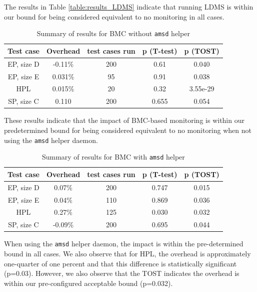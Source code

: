 \documentclass[conference]{IEEEtran}
\begin{document}
The results in Table \ref{table:results_LDMS} indicate that running LDMS is within our bound for being 
considered equivalent to no monitoring in all cases.

\begin{table}[h!]
\centering
\begin{tabular}{| c | c | c | c | c |} 
    \hline
    Test case & Overhead & test cases run & p (T-test) & p (TOST) \\ 
    \hline
    EP, size D & -0.11\% & 200 & 0.61 & 0.040 \\ 
    \hline
    EP, size E & 0.031\% & 95 & 0.91 & 0.038 \\ 
    \hline
    HPL & 0.015\% & 20 & 0.32 & 3.55e-29 \\
    \hline
    SP, size C & 0.110 & 200 & 0.655 & 0.054 \\
    \hline
\end{tabular}
\caption{Summary of results for BMC without \texttt{amsd} helper}
\end{table}

These results indicate that the impact of BMC-based monitoring is within our 
predetermined bound for being considered equivalent to no monitoring when not 
using the \texttt{amsd} helper daemon.

\begin{table}[h!]
\centering
\begin{tabular}{| c | c | c | c | c |} 
    \hline
    Test case & Overhead & test cases run & p (T-test) & p (TOST) \\ 
    \hline
    EP, size D & 0.07\% & 200 & 0.747 & 0.015 \\ 
    \hline
    EP, size E & 0.04\% & 110 & 0.869 & 0.036 \\ 
    \hline
    HPL & 0.27\% & 125 & 0.030 & 0.032 \\
    \hline
    SP, size C & -0.09\% & 200 & 0.695 & 0.044 \\
    \hline
\end{tabular}
\caption{Summary of results for BMC with \texttt{amsd} helper}
\label{table:results_BMC}
\end{table}

When using the \texttt{amsd} helper daemon, the impact is within the 
pre-determined bound in all cases. We also observe that for HPL, the overhead is 
approximately one-quarter of one percent and that this difference is statistically 
significant (p=0.03). However, we also observe that the TOST indicates the overhead
is within our pre-configured acceptable bound (p=0.032).
\end{document}
